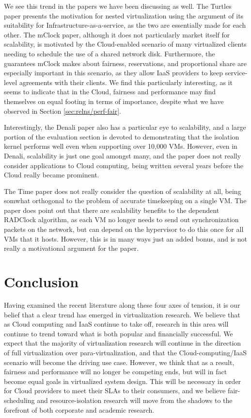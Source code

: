 \documentclass[letterpaper, twocolumn]{article}
\begin{document}
We see this trend in the papers we have been discussing as well.  The Turtles paper presents
the motivation for nested virtualization using the argument of its suitability for
Infrastructure-as-a-service, as the two are essentially made for each other.  The mClock paper,
although it does not particularly market itself
for scalability, is motivated by the Cloud-enabled scenario of many virtualized clients
needing to schedule the use of a shared network disk.  Furthermore, the guarantees mClock
makes about fairness, reservations, and proportional share are especially important
in this scenario, as they allow IaaS providers to keep service-level agreements with
their clients.  We find this particularly interesting, as it seems to indicate
that in the Cloud, fairness and performance may find themselves on equal footing in
terms of importance, despite what we have observed in Section \ref{sec:relns/perf-fair}.

Interestingly, the Denali paper also has a particular eye to scalability, and a large
portion of the evaluation section is devoted to demonstrating that the isolation kernel
performs well even when supporting over 10,000 VMs.  However, even in Denali, scalability
is just one goal amongst many, and the paper does not really consider applications
to Cloud computing, being written several years before the Cloud really became prominent.

The Time paper does not really consider the question of scalability at all, being
somwhat orthogonal to the problem of accurate timekeeping on a single VM.  The paper
does point out that there are scalability benefits to the dependent RADClock algorithm,
as each VM no longer needs to send out synchronization packets on the network, but can
depend on the hypervisor to do this once for all VMs that it hosts.  However, this is 
in many ways just an added bonus, and is not really a motivational argument for the paper.

\section{Conclusion}
\label{sec:conclusion}

Having examined the recent literature along these four axes of tension, it is our belief
that a clear trend has emerged in virtualization research.  We believe that as Cloud computing and
IaaS continue to take off, research in this area will continue to trend toward what
is both popular and financially successful.  We expect that the majority of virtualization
research will continue in the direction of full virtualization over para-virtualization,
and that the Cloud-computing/IaaS scenario will become the driving use case.
However, we think that as a result, fairness and performance will no longer be
competing ends, but will in fact become equal goals in virtualized system design.
This will be necessary in order for Cloud providers to meet their SLAs to their
consumers, and we believe fair-scheduling and resource-isolation research will move
from the shadows to the forefront of both corporate and academic research.
\end{document}
